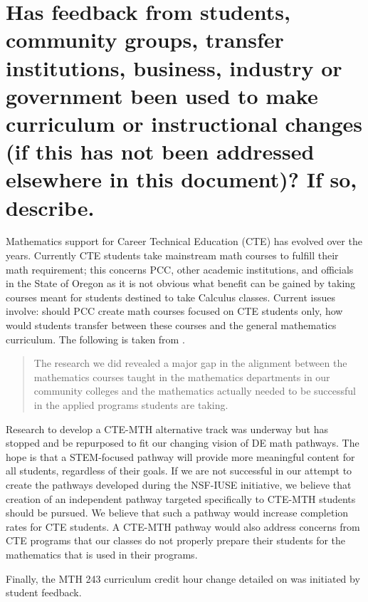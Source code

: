 \section[Curriculum/instructional changes due to internal/external feedback]{Has feedback from students, community groups, transfer institutions,
 business, industry or government been used to make curriculum or instructional
 changes (if this has not been addressed elsewhere in this document)?  If so,
describe. }
Mathematics support for Career Technical Education (CTE) has evolved over the
years.  Currently CTE students take mainstream math courses to fulfill their
math requirement;  this concerns PCC, other academic institutions, and
officials in the State of Oregon as it is not obvious what benefit can be gained
by taking courses meant for students destined to take Calculus classes. Current issues involve: should PCC create
math courses focused on CTE students only, how would students  transfer between
these courses and the general mathematics curriculum.   The following is taken
from \cite{natcentereduc}.
\begin{quote}
	The research we did revealed a major gap in the alignment between the
	mathematics courses taught in the mathematics departments in our community
	colleges and the mathematics actually needed to be successful in the applied
	programs students are taking.
\end{quote}
Research to develop a CTE-MTH alternative track was underway but has stopped
and be repurposed to fit our changing vision of DE math pathways.  The hope is that a STEM-focused  pathway will provide more meaningful content for all students, regardless of their goals.
If we are not successful in our attempt to create the pathways developed during the NSF-IUSE initiative, we believe that creation of an independent pathway targeted specifically to CTE-MTH students should be pursued.  We believe that such a pathway would increase completion rates for
CTE students. A CTE-MTH pathway would also address concerns from CTE programs that our classes
do not properly prepare their students for the mathematics that is used in
their programs.  

Finally, the MTH 243 curriculum credit hour change detailed on 
was initiated by student feedback.
